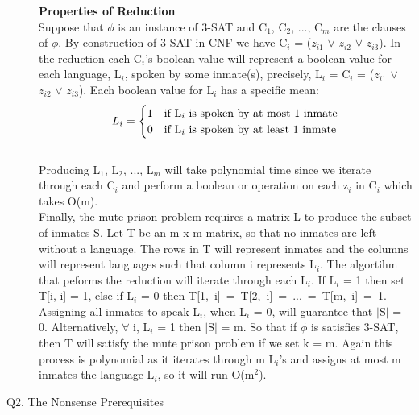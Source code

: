 \documentclass[10pt]{csc_assignment}
\begin{document}
\begin{description}
\textbf{Properties of Reduction}\\
Suppose that $\phi$ is an instance of 3-SAT and C$_{1}$, C$_{2}$, ..., C$_{m}$ are the clauses of $\phi$. By construction of 3-SAT in CNF we have C$_{i}$ = ($z_{i1}$ $\lor$ $z_{i2}$ $\lor$ $z_{i3}$). In the reduction each C$_{i}$'s boolean value will represent a boolean value for each language, L$_{i}$, spoken by some inmate(s), precisely, L$_{i}$ = C$_{i}$ = ($z_{i1}$ $\lor$ $z_{i2}$ $\lor$ $z_{i3}$). Each boolean value for L$_{i}$ has a specific mean:
\[
L_{i} = 
\begin{cases} 
      \hfill 1 \hfill & \text{if L$_{i}$ is spoken by at most 1 inmate} \\
      \hfill 0 \hfill & \text{if L$_{i}$ is spoken by at least 1 inmate} \\
  \end{cases}
\]\\
Producing L$_{1}$, L$_{2}$, ..., L$_{m}$ will take polynomial time since we iterate through each C$_{i}$ and perform a boolean or operation on each z$_{i}$ in C$_{i}$ which takes O(m).\\

Finally, the mute prison problem requires a matrix L to produce the subset of inmates S. Let T be an m x m matrix, so that no inmates are left without a language. The rows in T will represent inmates and the columns will represent languages such that column i represents L$_{i}$. The algortihm that peforms the reduction will iterate through each L$_{i}$. If L$_{i}$ = 1 then set T[i, i] = 1, else if L$_{i}$ =  0 then \mbox{T[1, i] = T[2, i] = ... = T[m, i] = 1}. Assigning all inmates to speak L$_{i}$, when L$_{i}$ = 0, will guarantee that $\mid$S$\mid$ = 0. Alternatively, $\forall$ i, L$_{i}$ = 1 then $\mid$S$\mid$ = m. So that if $\phi$ is satisfies 3-SAT, then T will satisfy the mute prison problem if we set k = m. Again this process is polynomial as it iterates through m L$_{i}$'s and assigns at most m inmates the language L$_{i}$, so it will run O(m$^{2}$). 

\newpage
\item[Q2. The Nonsense Prerequisites]



\end{description}
\end{document}
